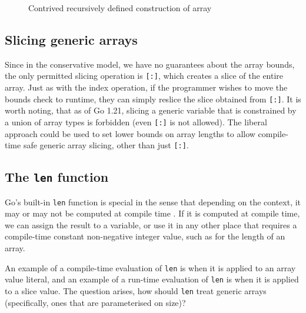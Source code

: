 \begin{figure}
    \caption{Contrived recursively defined construction of array}
    \label{fig:strange-arr-init}
\end{figure}

\subsection{Slicing generic arrays}
\label{sec:proposal-appx-slice}

Since in the conservative model, we have no guarantees about the array bounds,
the only permitted slicing operation is \texttt{[:]}, which creates a slice of
the entire array. Just as with the index operation, if the programmer wishes to
move the bounds check to runtime, they can simply reslice the slice obtained
from \texttt{[:]}. It is worth noting, that as of Go 1.21, slicing a generic
variable that is constrained by a union of array types is forbidden (even
\texttt{[:]} is not allowed). The liberal approach could be used to set lower
bounds on array lengths to allow compile-time safe generic array slicing, other
than just \texttt{[:]}.

\subsection{The \texttt{len} function}
\label{sec:proposal-appx-len}

Go's built-in \texttt{len} function is special in the sense that depending on
the context, it may or may not be computed at compile time \autocite{spec}. If
it is computed at compile time, we can assign the result to a 
variable, or use it in any other place that requires a compile-time constant
non-negative integer value, such as for the length of an array.

An example of a compile-time evaluation of \texttt{len} is when it is applied to
an array value literal, and an example of a run-time evaluation of \texttt{len}
is when it is applied to a slice value. The question arises, how should
\texttt{len} treat generic arrays (specifically, ones that are parameterised on
size)?

